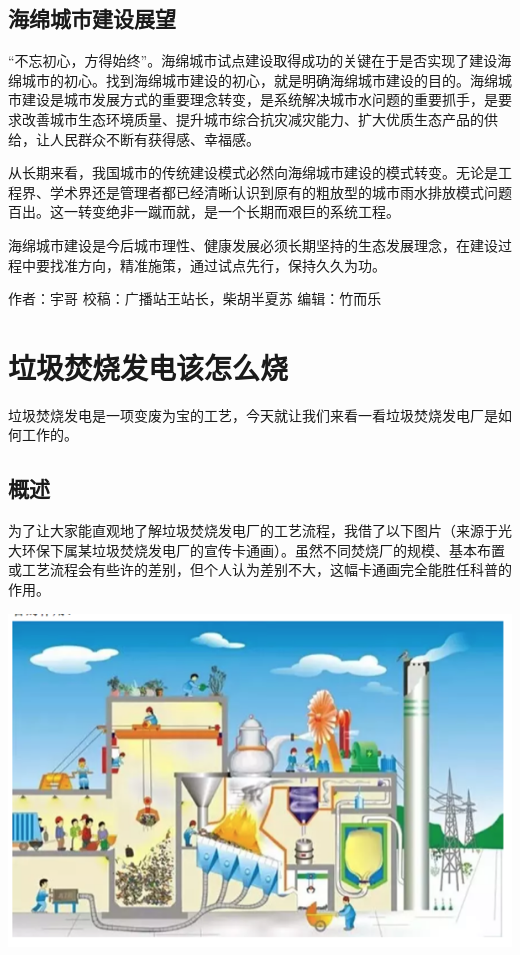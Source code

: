 \documentclass[]{book}
\begin{document}
\subsection{海绵城市建设展望}

``不忘初心，方得始终''。海绵城市试点建设取得成功的关键在于是否实现了建设海绵城市的初心。找到海绵城市建设的初心，就是明确海绵城市建设的目的。海绵城市建设是城市发展方式的重要理念转变，是系统解决城市水问题的重要抓手，是要求改善城市生态环境质量、提升城市综合抗灾减灾能力、扩大优质生态产品的供给，让人民群众不断有获得感、幸福感。

从长期来看，我国城市的传统建设模式必然向海绵城市建设的模式转变。无论是工程界、学术界还是管理者都已经清晰认识到原有的粗放型的城市雨水排放模式问题百出。这一转变绝非一蹴而就，是一个长期而艰巨的系统工程。

海绵城市建设是今后城市理性、健康发展必须长期坚持的生态发展理念，在建设过程中要找准方向，精准施策，通过试点先行，保持久久为功。

作者：宇哥 校稿：广播站王站长，柴胡半夏苏 编辑：竹而乐

\section{垃圾焚烧发电该怎么烧}

垃圾焚烧发电是一项变废为宝的工艺，今天就让我们来看一看垃圾焚烧发电厂是如何工作的。

\subsection{概述}

为了让大家能直观地了解垃圾焚烧发电厂的工艺流程，我借了以下图片（来源于光大环保下属某垃圾焚烧发电厂的宣传卡通画）。虽然不同焚烧厂的规模、基本布置或工艺流程会有些许的差别，但个人认为差别不大，这幅卡通画完全能胜任科普的作用。

\includegraphics[width=8.33in]{images/ljfs1}
\end{document}
